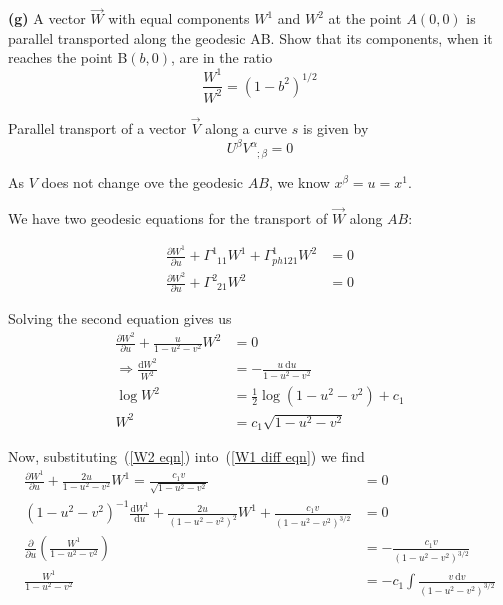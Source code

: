 \documentclass[a4paper]{article} %
\newcommand{\ph}[1]{\phantom{#1}}
\begin{document}

\begin{framed}
\textbf{(g)} A vector $\vec{W}$ with equal components $W^1$ and $W^2$ at the point $A(0,0)$ is parallel transported along the geodesic AB. Show that its components, when it reaches the point B$(b,0)$, are in the ratio
\begin{equation}
\frac{W^1}{W^2}=(1-b^2)^{1/2}
\end{equation}
\end{framed}

Parallel transport of a vector $\vec{V}$ along a curve $s$ is given by
\begin{equation}
U^{\beta}V^{\alpha}_{\ph{\alpha};\beta}=0
\end{equation}

As $V$ does not change ove the geodesic $AB$, we know $x^{\beta}=u=x^{1}$.

We have two geodesic equations for the transport of $\vec{W}$ along $AB$:

\begin{align}
\frac{\partial W^{1}}{\partial u}+\Gamma^{1}_{\ph{1}11}W^{1}
+\Gamma^{1}_{ph{1}21}W^2&=0 \label{W1 diff eqn}\\
\frac{\partial W^{2}}{\partial u}+\Gamma^{2}_{\ph{2}21}W^2&=0
\end{align}

Solving the second equation gives us
\begin{align}
\frac{\partial W^2}{\partial u}+\frac{u}{1-u^2-v^2}W^2&=0\\
\Rightarrow \frac{\text{d}W^2}{W^2}&=-\frac{u~\text{d}u}{1-u^2-v^2}\\
\log W^2&=\frac{1}{2}\log(1-u^2-v^2)+c_{1}\\
W^2&=c_1\sqrt{1-u^2-v^2}\label{W2 eqn}
\end{align}

Now, substituting~(\ref{W2 eqn}) into~(\ref{W1 diff eqn}) we find
\begin{align}
\frac{\partial W^{1}}{\partial u}+\frac{2u}{1-u^2-v^2}W^1=\frac{c_1 v	}{\sqrt{1-u^2-v^2}}&=0\\
(1-u^2-v^2)^{-1}\frac{\text{d}W^{1}}{\text{d}u}+\frac{2u}{(1-u^2-v^2)^2} W^{1}
+\frac{c_1 v}{(1-u^2-v^2)^{3/2}}&=0\\
\frac{\partial}{\partial u}\left(\frac{W^{1}}{1-u^2-v^2}\right)&=-\frac{c_1 v}{(1-u^2-v^2)^{3/2}}\\
\frac{W^1}{1-u^2-v^2}&=-c_1\int \frac{v~\text{d}v}{(1-u^2-v^2)^{3/2}}
\end{align}
\end{document}
